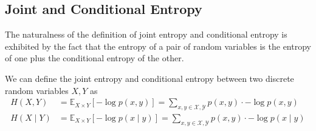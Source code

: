 \documentclass{article}
\begin{document}
  \subsection{Joint and Conditional Entropy}

    The naturalness of the definition of joint entropy and conditional entropy is exhibited by the fact that the entropy of a pair of random variables is the entropy of one plus the conditional entropy of the other. 

    \begin{definition}
      We can define the joint entropy and conditional entropy between two discrete random variables $X, Y$ as 
      \begin{align*}
        H(X, Y) & = \mathbb{E}_{X \times Y} [-\log p(x, y)] = \sum_{x, y \in \mathcal{X}, \mathcal{Y}} p(x, y) \cdot - \log p(x, y) \\
        H(X \mid Y) & = \mathbb{E}_{X \times Y} [- \log p(x \mid y)]  = \sum_{x, y \in \mathcal{X}, \mathcal{Y}} p(x, y) \cdot - \log p(x \mid y )
      \end{align*}
    \end{definition}
\end{document}
